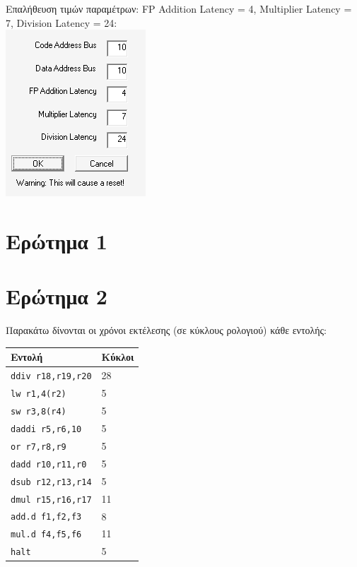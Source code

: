\documentclass[12pt]{article}
\begin{document}
Επαλήθευση τιμών παραμέτρων: FP Addition Latency = 4, Multiplier Latency = 7,
Division Latency = 24: \\

\includegraphics{res/latency.png}

\section{Ερώτημα 1}

\section{Ερώτημα 2}

Παρακάτω δίνονται οι χρόνοι εκτέλεσης (σε κύκλους ρολογιού) κάθε εντολής:

\begin{center}
\begin{tabular}{|l|l|}
	\hline
	\textbf{Εντολή} & \textbf{Κύκλοι} \\ 	
	\hline
	\lstinline|ddiv r18,r19,r20| & 28 \\
	\hline
	\lstinline|lw r1,4(r2)| & 5 \\
	\hline
	\lstinline|sw r3,8(r4)| & 5 \\
	\hline
	\lstinline|daddi r5,r6,10| & 5 \\
	\hline
	\lstinline|or r7,r8,r9| & 5 \\
	\hline
	\lstinline|dadd r10,r11,r0| & 5 \\
	\hline
	\lstinline|dsub r12,r13,r14| & 5 \\
	\hline
	\lstinline|dmul r15,r16,r17| & 11 \\
	\hline
	\lstinline|add.d f1,f2,f3| & 8 \\
	\hline
	\lstinline|mul.d f4,f5,f6| & 11 \\
	\hline
	\lstinline|halt| & 5 \\
	\hline
\end{tabular}
\end{center}
\end{document}
